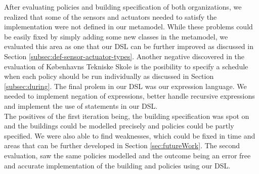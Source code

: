 After evaluating policies and building specification of both organizations, we realized that some of the sensors and actuators needed to satisfy the implementation were not defined in our metamodel. While these problems could be easily fixed by simply adding some new classes in the metamodel, we evaluated this area as one that our DSL can be further improved as discussed in Section \ref{subsec:def-sensor-actuator-types}. Another negative discovered in the evaluation of K\o benhavns Tekniske Skole is the posibility to specify a schedule when each policy should be run individually as discussed in Section \ref{subsec:during}. The final prolem in our DSL was our expression language. We needed to implement negation of expressions, better handle recursive expressions and implement the use of statements in our DSL.\\

The positives of the first iteration being, the building specification was spot on and the buildings could be modelled precisely and policies could be partly specified. We were also able to find weaknesses, which could be fixed in time and areas that can be further developed in Section \ref{sec:futureWork}. The second evaluation, saw the same policies modelled and the outcome being an error free and accurate implementation of the building and policies using our DSL. 
